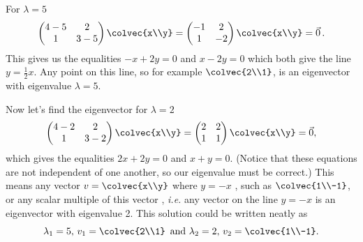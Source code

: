 {For $\lambda= 5$
\[
\begin{pmatrix}
4-5 & 2\\
1 & 3-5 \\ 
\end{pmatrix} \colvec{x\\y} =
\begin{pmatrix}
-1 & 2\\
1 & -2 \\ 
\end{pmatrix} \colvec{x\\y}
= \vec 0 \, .
\]
This gives us the equalities $-x +2y = 0$ and $x -2y = 0$ which both give the line $ y = \frac{1}{2}x$. Any point on this line, so for example $\colvec{2\\1}$, is an eigenvector with eigenvalue $\lambda = 5$.

Now let's find the eigenvector for $\lambda = 2$
\[
\begin{pmatrix}
4-2 & 2\\
1 & 3-2 \\ 
\end{pmatrix} \colvec{x\\y} =
\begin{pmatrix}
2 & 2\\
1 & 1 \\ 
\end{pmatrix} \colvec{x\\y}
= \vec 0 ,
\]
which gives the equalities $2x+2y = 0$ and $x+y = 0$. 
(Notice that these equations are not independent of one another, so our eigenvalue must be correct.)
This means any vector $v =  \colvec{x\\y}$ where $y = -x$ , such as $\colvec{1\\-1}$, or any scalar multiple of this vector , {\itshape i.e.} any vector on the line $y = -x$ is an eigenvector with eigenvalue 2. This solution could be written neatly as
 \[
\lambda_1 = 5, \, v_1= \colvec{2\\1} \, \text{ and } \lambda_2 = 2, \, v_2=\colvec{1\\-1}.
\]
} %

